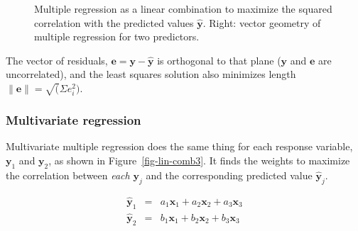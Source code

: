 \documentclass[
  letterpaper,
  10pt,
  krantz2]{krantz}
\begin{document}
\begin{figure}


\caption{\label{fig-lin-comb-mra}Multiple regression as a linear
combination to maximize the squared correlation with the predicted
values \(\hat{\mathbf{y}}\). Right: vector geometry of multiple
regression for two predictors.}

\end{figure}%

The vector of residuals,
\(\mathbf{e} = \mathbf{y} -\widehat{\mathbf{y}}\) is orthogonal to that
plane (\(\mathbf{y}\) and \(\mathbf{e}\) are uncorrelated), and the
least squares solution also minimizes length
\(\parallel \mathbf{e} \parallel = \sqrt(\Sigma e_i^2)\).

\subsubsection*{Multivariate regression}\label{multivariate-regression}

Multivariate multiple regression does the same thing for each response
variable, \(\mathbf{y}_1\) and \(\mathbf{y}_2\), as shown in
Figure~\ref{fig-lin-comb3}. It finds the weights to maximize the
correlation between \emph{each} \(\mathbf{y}_j\) and the corresponding
predicted value \(\widehat{\mathbf{y}}_j\).

\begin{eqnarray*}
\widehat{\mathbf{y}}_1 & = & a_1 \mathbf{x}_1 + a_2 \mathbf{x}_2 + a_3 \mathbf{x}_3 \\
\widehat{\mathbf{y}}_2 & = & b_1 \mathbf{x}_1 + b_2 \mathbf{x}_2 + b_3 \mathbf{x}_3 \\
\end{eqnarray*}
\end{document}
